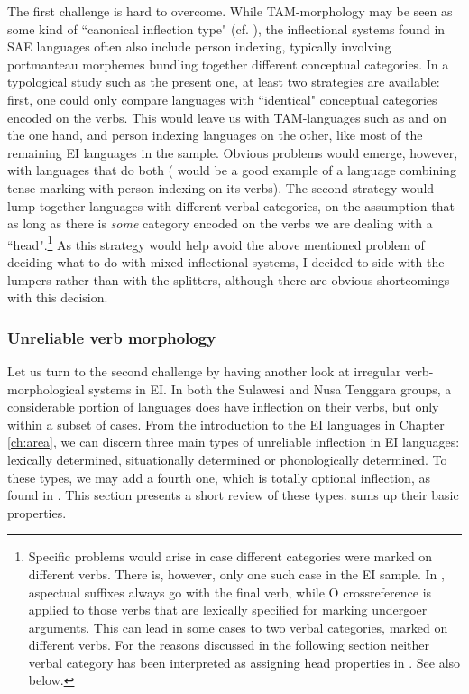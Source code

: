 The first challenge is hard to overcome. While TAM-morphology may be seen as some kind of ``canonical inflection type" (cf. \citealt{foley2010events}), the inflectional systems found in SAE languages often also include person indexing, typically involving portmanteau morphemes bundling together different conceptual categories. In a typological study such as the present one, at least two strategies are available: first, one could only compare languages with ``identical" conceptual categories encoded on the verbs. This would leave us with TAM-languages such as  and  on the one hand, and person indexing languages on the other, like most of the remaining EI languages in the sample. Obvious problems would emerge, however, with languages that do both ( would be a good example of a language combining tense marking with person indexing on its verbs). The second strategy would lump together languages with different verbal categories, on the assumption that as long as there is \emph{some} category encoded on the verbs we are dealing with a ``head".\footnote{Specific problems would arise in case different categories were marked on different verbs. There is, however, only one such case in the EI sample. In , aspectual suffixes always go with the final verb, while O crossreference is applied to those verbs that are lexically specified for marking undergoer arguments. This can lead in some cases to two verbal categories, marked on different verbs. For the reasons discussed in the following section neither verbal category has been interpreted as assigning head properties in . See also  below.} As this strategy would help avoid the above mentioned problem of deciding what to do with mixed inflectional systems, I decided to side with the lumpers rather than with the splitters, although there are obvious shortcomings with this decision. 
 
\subsubsection{Unreliable verb morphology} \label{sec:unreliable}

Let us turn to the second challenge by having another look at irregular verb-morphological systems in EI. In both the Sulawesi and Nusa Tenggara groups, a considerable portion of languages does have inflection on their verbs, but only within a subset of cases. From the introduction to the EI languages in Chapter \ref{ch:area}, we can discern three main types of unreliable inflection in EI languages: lexically determined, situationally determined or phonologically determined. To these types, we may add a fourth one, which is totally optional inflection, as found in . This section presents a short review of these types.  sums up their basic properties.

